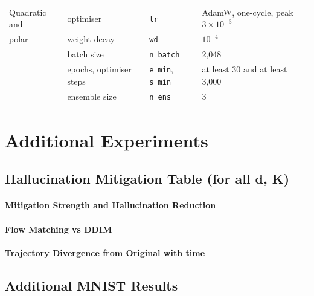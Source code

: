 \begin{table}[htbp]
\begin{tabular}{llll}
\midrule
Quadratic and  & optimiser                 & \texttt{lr}        & AdamW, one-cycle, peak $3 \times 10^{-3}$ \\
polar          & weight decay              & \texttt{wd}        & $10^{-4}$ \\
               & batch size                & \texttt{n\_batch}  & 2{,}048 \\
               & epochs, optimiser steps   & \texttt{e\_min}, \texttt{s\_min} & at least 30 and at least 3{,}000 \\
               & ensemble size             & \texttt{n\_ens}    & 3 \\
\bottomrule
\end{tabular}
\end{table}


\section{Additional Experiments}
\label{app:additional_experiments}


\subsection{Hallucination Mitigation Table (for all d, K)}
\label{app:hall-mitigation}



\paragraph{Mitigation Strength and Hallucination Reduction}

\paragraph{Flow Matching vs DDIM}

\paragraph{Trajectory Divergence from Original with time}


\subsection{Additional MNIST Results}
\label{app:mnist}

